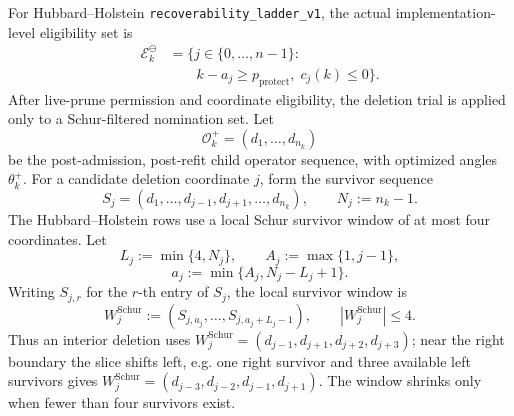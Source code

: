 \documentclass[
  reprint,
  amsmath,
  amssymb,
  aps,
  pra,
  nofootinbib,
  superscriptaddress,
  floatfix
]{revtex4-2}
\begin{document}
For Hubbard--Holstein \texttt{recoverability\_ladder\_v1}, the actual implementation-level eligibility set is
\[
\begin{aligned}
\mathcal E_k^{\ominus}
&=
\bigl\{
j\in\{0,\ldots,n-1\}:
\\[-0.25ex]
&\qquad
k-a_j\ge p_{\mathrm{protect}},
\;c_j(k)\le 0
\bigr\}.
\end{aligned}
\]
After live-prune permission and coordinate eligibility, the deletion trial is applied only to a Schur-filtered nomination set.  Let
\[
\mathcal O_k^+=(d_1,\ldots,d_{n_k})
\]
be the post-admission, post-refit child operator sequence, with optimized angles \(\theta_k^+\).  For a candidate deletion coordinate \(j\), form the survivor sequence
\[
S_j=(d_1,\ldots,d_{j-1},d_{j+1},\ldots,d_{n_k}),
\qquad
N_j:=n_k-1 .
\]
The Hubbard--Holstein rows use a local Schur survivor window of at most four coordinates.  Let
\[
L_j:=\min\{4,N_j\},
\qquad
A_j:=\max\{1,j-1\},
\]
\[
a_j:=\min\{A_j,N_j-L_j+1\}.
\]
Writing \(S_{j,r}\) for the \(r\)-th entry of \(S_j\), the local survivor window is
\[
W_j^{\mathrm{Schur}}
:=
(S_{j,a_j},\ldots,S_{j,a_j+L_j-1}),
\qquad
|W_j^{\mathrm{Schur}}|\le 4 .
\]
Thus an interior deletion uses
\(W_j^{\mathrm{Schur}}=(d_{j-1},d_{j+1},d_{j+2},d_{j+3})\); near the right boundary the slice shifts left, e.g. one right survivor and three available left survivors gives \(W_j^{\mathrm{Schur}}=(d_{j-3},d_{j-2},d_{j-1},d_{j+1})\).  The window shrinks only when fewer than four survivors exist.
\end{document}

